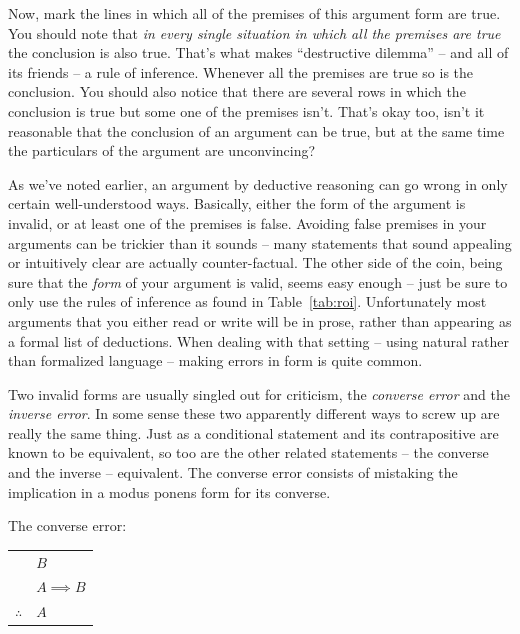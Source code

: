 Now, mark the lines in which all of the premises of this argument form 
are true.  You should note that {\em in every single situation in which 
all the premises are true} the conclusion is also true.  That's what 
makes ``destructive dilemma'' -- and all of its friends -- a rule of 
inference.  Whenever all the premises are true so is the conclusion.  
You should also notice that there are several rows in which the 
conclusion is true but some one of the premises isn't.  That's
okay too, isn't it reasonable that the conclusion of an argument 
can be true, but at the same time the particulars of the argument 
are unconvincing? 

As we've noted earlier, an argument by deductive reasoning can go wrong 
in only certain well-understood ways.  Basically, either the form of the 
argument is invalid, or at least one of the premises is false.  Avoiding 
false premises in your arguments can be trickier than it sounds -- many 
statements that sound appealing or intuitively clear are actually
counter-factual.  The other side of the coin, being sure that the 
\emph{form} 
of your argument is valid, seems easy enough -- just be 
sure to only use the rules of inference as found in Table~\ref{tab:roi}.  
Unfortunately most arguments that you either read or write
will be in prose, rather than appearing as a formal list of deductions.  
When dealing with that setting -- using natural rather than formalized 
language -- making errors in form is quite common.  

Two invalid forms are usually singled out for criticism, the 
\emph{converse error} and the 
\emph{inverse error}.  In some sense 
these two apparently different ways to screw up are really the same thing.  
Just as a conditional statement and its contrapositive are known to be 
equivalent, so too are the other related statements -- the
converse and the inverse -- equivalent.  The converse error consists of 
mistaking the implication in a modus ponens form for its converse.

The converse error:

\begin{center}
\begin{tabular}{cl}
 & $B$ \\
 & $A \implies B$ \\ \hline
$\therefore$ & $A$ \\
\end{tabular}
\end{center}
   
